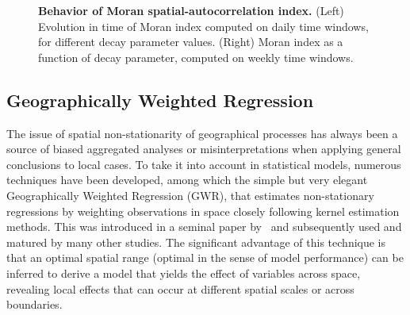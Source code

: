 \documentclass[10pt]{article}
\begin{document}
\begin{figure}
\centering
\label{fig:moran}
\caption{\textbf{Behavior of Moran spatial-autocorrelation index.} (Left) Evolution in time of Moran index computed on daily time windows, for different decay parameter values. (Right) Moran index as a function of decay parameter, computed on weekly time windows.}
\end{figure}

\subsection{Geographically Weighted Regression}

The issue of spatial non-stationarity of geographical processes has always been a source of biased aggregated analyses or misinterpretations when applying general conclusions to local cases. To take it into account in statistical models, numerous techniques have been developed, among which the simple but very elegant Geographically Weighted Regression (GWR), that estimates non-stationary regressions by weighting observations in space closely following kernel estimation methods. This was introduced in a seminal paper by~\cite{brunsdon1996geographically} and subsequently used and matured by many other studies. The significant advantage of this technique is that an optimal spatial range (optimal in the sense of model performance) can be inferred to derive a model that yields the effect of variables across space, revealing local effects that can occur at different spatial scales or across boundaries.
\end{document}
